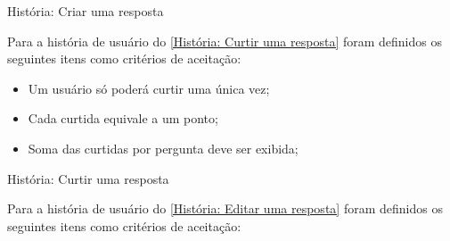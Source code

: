 \def\arraystretch{2}
\begin{quadro}[htb]
\centering
\ABNTEXfontereduzida
\caption[História: Criar uma resposta]{História: Criar uma resposta}
\label{História: Criar uma resposta}
\end{quadro}
\FloatBarrier 

Para a história de usuário do \autoref{História: Curtir uma resposta} foram definidos os seguintes itens como critérios de aceitação:

\begin{itemize}
\item Um usuário só poderá curtir uma única vez;
\item Cada curtida equivale a um ponto;
\item Soma das curtidas por pergunta deve ser exibida;
\end{itemize}

\def\arraystretch{2}
\begin{quadro}[htb]
\centering
\ABNTEXfontereduzida
\caption[História: Curtir uma resposta]{História: Curtir uma resposta}
\label{História: Curtir uma resposta}
\end{quadro}
\FloatBarrier 

Para a história de usuário do \autoref{História: Editar uma resposta} foram definidos os seguintes itens como critérios de aceitação:

